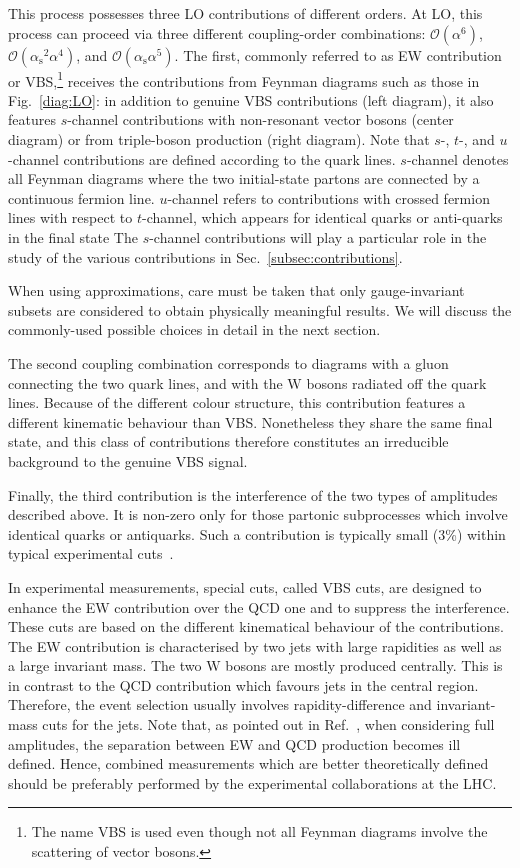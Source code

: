 \documentclass[twocolumn,epjc3]{svjour3} %
\newcommand{\PW}{\ensuremath{\text{W}}\xspace}
\newcommand{\alphas}{\ensuremath{\alpha_\text{s}}\xspace}
\begin{document}
This process possesses three LO contributions of different orders.
At LO, this process can proceed via three different coupling-order combinations:
$\mathcal{O}{\left(\alpha^{6}\right)}$, $\mathcal{O}{\left(\alphas^{2}\alpha^{4}\right)}$, and $\mathcal{O}{\left(\alphas\alpha^{5}\right)}$.
The first, commonly referred to as EW contribution or VBS,\footnote{The name VBS is used even though not all Feynman diagrams involve the scattering
of vector bosons.} receives the contributions from Feynman diagrams such as those in Fig.~\ref{diag:LO}:
in addition to genuine VBS contributions (left diagram), it also features $s$-channel contributions with non-resonant vector bosons 
(center diagram) or from
triple-boson production (right diagram).
Note that $s$-, $t$-, and $u$-channel contributions are defined according to the quark lines.
$s$-channel denotes all Feynman diagrams where the two initial-state partons are connected by a continuous fermion line.
$u$-channel refers to contributions with crossed fermion lines with respect to $t$-channel, which appears for identical quarks or anti-quarks in the final state
The $s$-channel contributions will play a particular role in the study of the various contributions in Sec.~\ref{subsec:contributions}.

When using approximations, care must be taken that only gauge-invariant subsets are considered to obtain physically meaningful results. We will discuss the commonly-used possible choices in detail in the next section.

The second coupling combination corresponds to diagrams with a gluon connecting the two quark lines, and with the $\PW$ bosons 
radiated off the quark lines. Because of the different colour structure, this contribution features a 
different kinematic behaviour than VBS. Nonetheless they share the same final state, and this class of contributions therefore constitutes an irreducible background to the genuine VBS signal.

Finally, the third contribution is the interference of the two types of amplitudes described above.
It is non-zero only for those partonic subprocesses which involve identical quarks or antiquarks.
Such a contribution is typically small (3\%) within typical experimental cuts~\cite{Biedermann:2017bss}.

In experimental measurements, special cuts, called VBS cuts, are designed to enhance the EW contribution over the QCD one and to suppress the interference.
These cuts are based on the different kinematical behaviour of the contributions.
The EW contribution is characterised by two jets with large rapidities as well as a large invariant mass.
The two $\PW$ bosons are mostly produced centrally.
This is in contrast to the QCD contribution which favours jets in the central region.
Therefore, the event selection usually involves rapidity-difference and invariant-mass cuts for the jets.
Note that, as pointed out in Ref.~\cite{Biedermann:2017bss}, when considering full amplitudes, the separation between EW and QCD production becomes ill
defined.
Hence, combined measurements which are better theoretically defined should be preferably performed by the experimental collaborations at the LHC.
\end{document}
